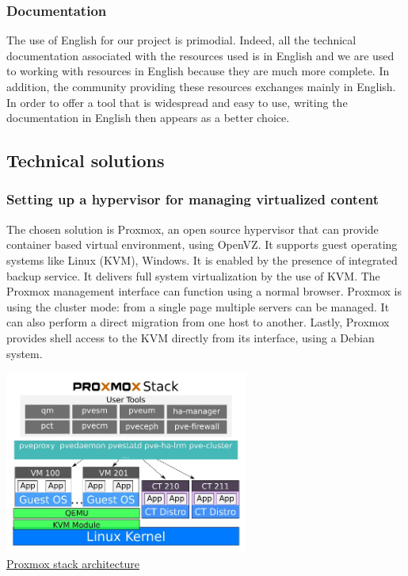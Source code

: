 \vspace{0.5cm}
\subsubsection{Documentation}
The use of English for our project is primodial. Indeed, all the technical
documentation associated with the resources used is in English and we are used
to working with resources in English because they are much more complete. In
addition, the community providing these resources exchanges mainly in English. In order
to offer a tool that is widespread and easy to use, writing the
documentation in English then appears as a better choice. \\


\pagebreak

\subsection{Technical solutions}

\vspace{1cm}
\subsubsection{Setting up a hypervisor for managing virtualized content}

The chosen solution is Proxmox, an open source hypervisor that can provide container based virtual environment, using OpenVZ.
It supports guest operating systems like Linux (KVM), Windows. It is enabled by the presence of integrated backup service.
It delivers full system virtualization by the use of KVM.
The Proxmox management interface can function using a normal browser.
Proxmox is using the cluster mode: from a single page multiple servers can be managed.
It can also perform a direct migration from one host to another.
Lastly, Proxmox provides shell access to the KVM directly from its interface, using a Debian system.

\begin{center}

\includegraphics[width=0.6\textwidth]{images/proxmox-stack-example.jpg}
\\
\underline{Proxmox stack architecture}

\end{center}

